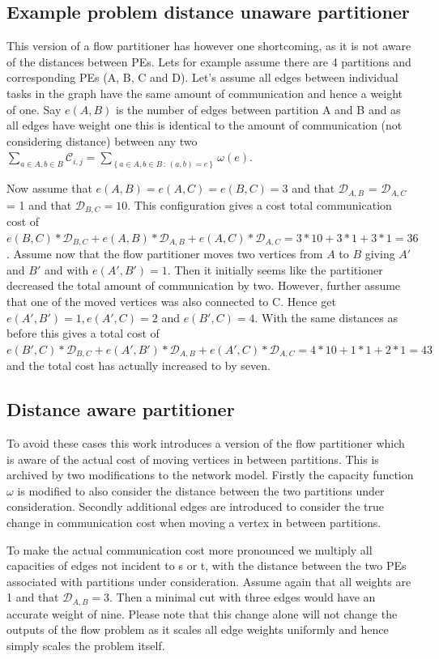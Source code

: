 \documentclass[acmsmall,nonacm,screen,review]{acmart}
\newcommand{\sodass}{\,:\,}
\newcommand{\setGilt}[2]{\left\{ #1\sodass #2\right\}}
\begin{document}
\subsection*{Example problem distance unaware partitioner}
This version of a flow partitioner has however one shortcoming, as it is not aware of the distances
between PEs. Lets for example assume there are 4 partitions and corresponding PEs (A, B, C and D). 
Let's assume all edges between individual tasks in the graph have the same amount of communication 
and hence a weight of one. Say $e(A,B)$ is the number of edges between partition A and B and as all
edges have weight one this is identical to the amount of communication (not considering distance) 
between any two $\sum_{ a \in A, b \in B}\mathcal{C}_{i,j}=\sum_{\setGilt{a \in A,b \in B}
{(a,b)=e}}\omega(e)$.

Now assume that $e(A,B) = e(A,C) = e(B,C) = 3$ and that $\mathcal{D}_{A,B}$ = $\mathcal{D}_{A,C}$ = 1 
and that $\mathcal{D}_{B,C}=10$. This configuration gives a cost total communication cost of 
$e(B,C)*\mathcal{D}_{B,C}+e(A,B)*\mathcal{D}_{A,B}+e(A,C)*\mathcal{D}_{A,C}=3*10+3*1+3*1=36$. 
Assume now that the flow partitioner moves two vertices from $A$ to $B$ giving $A'$ and $B'$ and 
with $e(A',B')=1$. Then it initially seems like the partitioner decreased the total amount of 
communication by two. However, further assume that one of the moved vertices was also connected to C. 
Hence get $e(A',B')=1, e(A',C)=2$ and $e(B',C)=4$. With the same distances as before this 
gives a total cost of $e(B',C)*\mathcal{D}_{B,C}+e(A',B')*\mathcal{D}_{A,B}+e(A',C)*\mathcal{D}_{A,C}=
4*10+1*1+2*1=43$ and the total cost has actually increased to by seven.

\subsection*{Distance aware partitioner}
To avoid these cases this work introduces a version of the flow partitioner which is aware of the actual
cost of moving vertices in between partitions. This is archived by two modifications to the network model.
Firstly the capacity function $\omega$ is modified to also consider the distance between the two 
partitions under consideration. Secondly additional edges are introduced to consider the true change in 
communication cost when moving a vertex in between partitions.

To make the actual communication cost more pronounced we multiply all capacities of edges not incident to
s or t, with the distance between the two PEs associated with partitions under consideration. Assume again
that all weights are 1 and that $\mathcal{D}_{A,B} = 3$. Then a minimal cut with three edges would have an 
accurate weight of nine. Please note that this change alone will not change the outputs of the flow problem
as it scales all edge weights uniformly and hence simply scales the problem itself.
\end{document}
